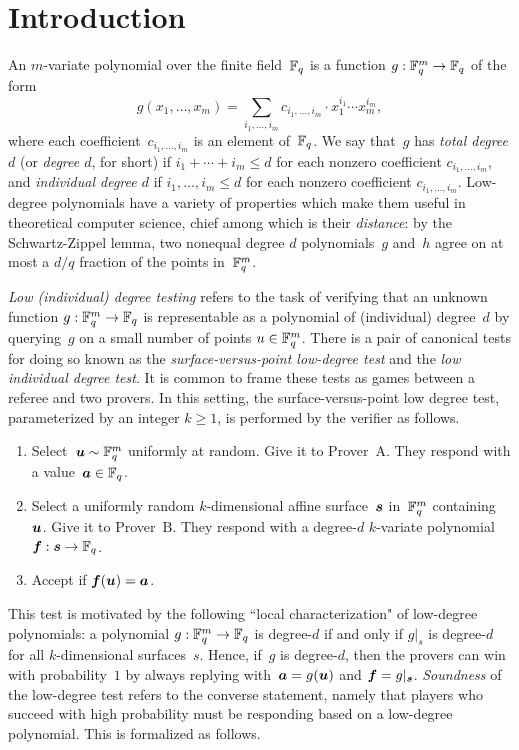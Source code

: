 \section{Introduction}\label{sec:intro}

An $m$-variate polynomial over the finite field~$\mathbb F_q$ is a function $g:\mathbb F_q^m \rightarrow \mathbb F_q$ of the form
\begin{equation*}
g(x_1, \ldots, x_m) = \sum_{i_1, \ldots, i_m} c_{i_1, \ldots, i_m} \cdot x_1^{i_1} \cdots x_{m}^{i_m},
\end{equation*}
where each coefficient~$c_{i_1, \ldots, i_m}$ is an element of~$\mathbb F_q$.
We say that~$g$ has \emph{total degree $d$}
(or \emph{degree $d$}, for short) if $i_1 + \cdots + i_m \leq d$ for each nonzero coefficient $c_{i_1, \ldots, i_m}$,
and \emph{individual degree $d$} if $i_1, \ldots, i_m \leq d$ for each nonzero coefficient $c_{i_1, \ldots, i_m}$.
Low-degree polynomials have a variety of properties which make them useful in theoretical computer science,
chief among which is their \emph{distance}:
by the Schwartz-Zippel lemma, two nonequal degree $d$ polynomials~$g$ and~$h$ agree on at most a $d/q$ fraction of the points in~$\mathbb F_q^m$.



\emph{Low (individual) degree testing} refers to the task 
of verifying that an unknown function $g:\mathbb F_q^m \rightarrow \mathbb F_q$
is representable as a polynomial of (individual) degree~$d$
by querying~$g$ on a small number of points $u \in \mathbb F_q^m$.
There is a pair of canonical tests for doing so
known as the \emph{surface-versus-point low-degree test}
and the \emph{low individual degree test}.
It is common to frame these tests
as games between a referee and two provers.
In this setting, the surface-versus-point low degree test, parameterized by an integer $k \geq 1$, is performed by the verifier as follows.
\begin{enumerate}
\item Select~$\boldsymbol{u} \sim \mathbb F_q^m$ uniformly at random. Give it to Prover~$\mathrm{A}$. They respond with a value~$\boldsymbol{a} \in \mathbb F_q$.
\item Select a uniformly random $k$-dimensional affine surface~$\boldsymbol{s}$ in~$\mathbb F_q^m$ containing~$\boldsymbol{u}$.
	Give it to Prover~$\mathrm{B}$. They respond with a degree-$d$ $k$-variate polynomial $\boldsymbol{f}:\boldsymbol{s}\rightarrow \mathbb F_q$.
\item Accept if $\boldsymbol{f}(\boldsymbol{u}) = \boldsymbol{a}$.
\end{enumerate}
This test is motivated by the following ``local characterization" of low-degree polynomials:
a polynomial $g:\mathbb F_q^m \rightarrow \mathbb F_q$ is degree-$d$
if and only if $g|_s$ is degree-$d$ for all $k$-dimensional surfaces~$s$.
Hence, if~$g$ is degree-$d$,
then the provers can win with probability~$1$ by always replying with~$\boldsymbol{a} = g(\boldsymbol{u})$ and $\boldsymbol{f} = g|_{\boldsymbol{s}}$.
\emph{Soundness} of the low-degree test refers to the converse statement,
namely that players who succeed with high probability
must be responding based on a low-degree polynomial.
This is formalized as follows.

